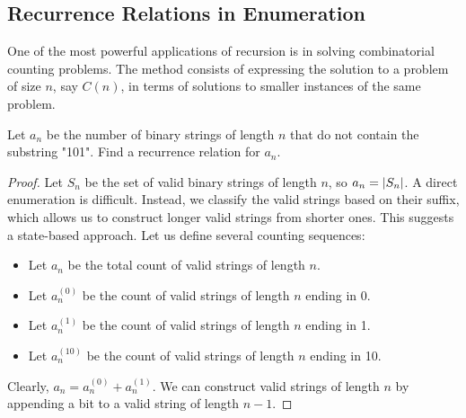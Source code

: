 \subsection{Recurrence Relations in Enumeration}

One of the most powerful applications of recursion is in solving combinatorial counting problems. The method consists of expressing the solution to a problem of size $n$, say $C(n)$, in terms of solutions to smaller instances of the same problem.

\begin{proposition}
Let $a_n$ be the number of binary strings of length $n$ that do not contain the substring "101". Find a recurrence relation for $a_n$.
\end{proposition}
\begin{proof}
Let $S_n$ be the set of valid binary strings of length $n$, so $a_n = \left| S_n \right|$. A direct enumeration is difficult. Instead, we classify the valid strings based on their suffix, which allows us to construct longer valid strings from shorter ones. This suggests a state-based approach. Let us define several counting sequences:
\begin{itemize}
    \item Let $a_n$ be the total count of valid strings of length $n$.
    \item Let $a_n^{(0)}$ be the count of valid strings of length $n$ ending in 0.
    \item Let $a_n^{(1)}$ be the count of valid strings of length $n$ ending in 1.
    \item Let $a_n^{(10)}$ be the count of valid strings of length $n$ ending in 10.
\end{itemize}
Clearly, $a_n = a_n^{(0)} + a_n^{(1)}$. We can construct valid strings of length $n$ by appending a bit to a valid string of length $n-1$.


\end{proof}
